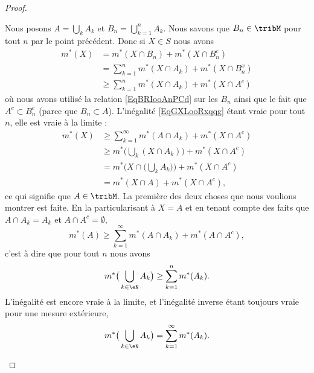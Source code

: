 \begin{proof}
\begin{subproof}
        Nous posons \( A=\bigcup_kA_k\) et \( B_n=\bigcup_{k=1}^nA_k\). Nous savons que \( B_n\in\tribM\) pour tout \( n\) par le point précédent. Donc si \( X\in S\) nous avons
        \begin{subequations}
            \begin{align}   \label{EqGXLooRxqqg}
                m^*(X)&=m^*(X\cap B_n)+m^*(X\cap B_n^c)\\
                &=\sum_{k=1}^nm^*(X\cap A_k)+m^*(X\cap B_n^x)\\
                &\geq\sum_{k=1}^nm^*(X\cap A_k)+m^*(X\cap A^c)
            \end{align}
        \end{subequations}
        où nous avons utilisé la relation \eqref{EqBRIooAnPCd} sur les \( B_n\) ainsi que le fait que \( A^c\subset B_n^c\) (parce que \( B_n\subset A\)). L'inégalité \eqref{EqGXLooRxqqg} étant vraie pour tout \( n\), elle est vraie à la limite :
        \begin{subequations}
            \begin{align}
                m^*(X)&\geq \sum_{k=1}^{\infty}m^*(A\cap A_k)+m^*(X\cap A^c)\\
                &\geq m^*\Big( \bigcup_k(X\cap A_k) \Big)+m^*(X\cap A^c)\\
                &=m^*\Big( X\cap \big( \bigcup_kA_k \big) \Big)+m^*(X\cap A^c)\\
                &=m^*(X\cap A)+m^*(X\cap A^c),
            \end{align}
        \end{subequations}
        ce qui signifie que \( A\in\tribM\). La première des deux choses que nous voulions montrer est faite. En la particularisant à \( X=A\) et en tenant compte des faits que \( A\cap A_k=A_k\) et \( A\cap A^c=\emptyset\),
        \begin{equation}
            m^*(A)\geq \sum_{k=1}^{\infty}m^*(A\cap A_k)+m^*(A\cap A^c),
        \end{equation}
        c'est à dire que pour tout \( n\) nous avons
        \begin{equation}
            m^*\big( \bigcup_{k\in \eN}A_k \big)\geq \sum_{k=1}^nm^*(A_k).
        \end{equation}
        L'inégalité est encore vraie à la limite, et l'inégalité inverse étant toujours vraie pour une mesure extérieure,
        \begin{equation}
            m^*\big( \bigcup_{k\in \eN}A_k \big)=\sum_{k=1}^{\infty}m^*(A_k).
        \end{equation}


\end{subproof}
\end{proof}
